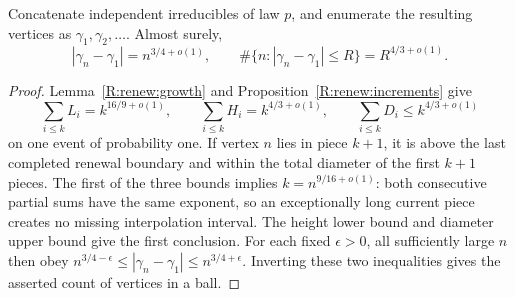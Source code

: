 \begin{theorem}\label{R:renew:infinite}
Concatenate independent irreducibles of law $p$, and enumerate the resulting vertices as $\gamma_1,\gamma_2,\ldots$. Almost surely,
\[
 |\gamma_n-\gamma_1|=n^{3/4+o(1)},\qquad
 \#\{n:|\gamma_n-\gamma_1|\le R\}=R^{4/3+o(1)}.
\]
\end{theorem}
\begin{proof}
Lemma~\ref{R:renew:growth} and Proposition~\ref{R:renew:increments} give
\[
 \sum_{i\le k}L_i=k^{16/9+o(1)},\qquad
 \sum_{i\le k}H_i=k^{4/3+o(1)},\qquad
 \sum_{i\le k}D_i\le k^{4/3+o(1)}
\]
on one event of probability one. If vertex $n$ lies in piece $k+1$, it is above the last completed renewal boundary and within the total diameter of the first $k+1$ pieces. The first of the three bounds implies $k=n^{9/16+o(1)}$: both consecutive partial sums have the same exponent, so an exceptionally long current piece creates no missing interpolation interval. The height lower bound and diameter upper bound give the first conclusion. For each fixed $\epsilon>0$, all sufficiently large $n$ then obey $n^{3/4-\epsilon}\le |\gamma_n-\gamma_1|\le n^{3/4+\epsilon}$. Inverting these two inequalities gives the asserted count of vertices in a ball.
\end{proof}

